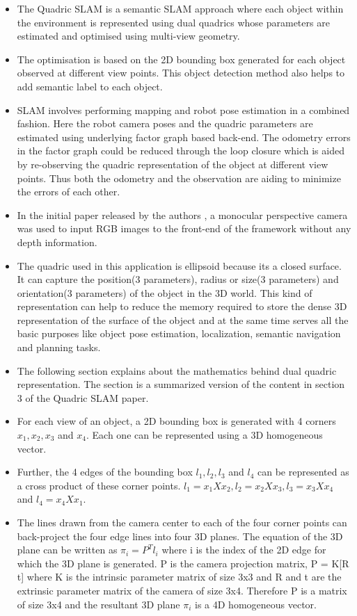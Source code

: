 \documentclass[report.tex]{subfiles}
\begin{document}
\begin{itemize}
\item The Quadric SLAM is a semantic SLAM approach where each object within the environment is represented using dual quadrics whose parameters are estimated and optimised using multi-view geometry.
\item The optimisation is based on the 2D bounding box generated for each object observed at different view points. This object detection method also helps to add semantic label to each object.
\item SLAM involves performing mapping and robot pose estimation in a combined fashion. Here the robot camera poses and the quadric parameters are estimated using underlying factor graph based back-end. The odometry errors in the factor graph could be reduced through the loop closure which is aided by re-observing the quadric representation of the object at different view points. Thus both the odometry and the observation are aiding to minimize the errors of each other.
\item In the initial paper released by the authors \cite{sünderhauf2017dual}, a monocular perspective camera was used to input RGB images to the front-end of the framework without any depth information.
\item The quadric used in this application is ellipsoid because its a closed surface. It can capture the position(3 parameters), radius or size(3 parameters) and orientation(3 parameters) of the object in the 3D world. This kind of representation can help to reduce the memory required to store the dense 3D representation of the surface of the object and at the same time serves all the basic purposes like object pose estimation, localization, semantic navigation and planning tasks.
\item The following section explains about the mathematics behind dual quadric representation. The section is a summarized version of the content in section 3 of the Quadric SLAM paper\cite{sünderhauf2017dual}.
\item For each view of an object, a 2D bounding box is generated with 4 corners $x_{1}, x_{2}, x_{3}$ and $x_{4}$. Each one can be represented using a 3D homogeneous vector.
\item Further, the 4 edges of the bounding box $l_{1}, l_{2}, l_{3}$ and $l_{4}$ can be represented as a cross product of these corner points. $l_{1} = x_{1} X x_{2}, l_{2} = x_{2} X x_{3}, l_{3} = x_{3} X x_{4}$ and $l_{4} = x_{4} X x_{1}$.
\item The lines drawn from the camera center to each of the four corner points can back-project the four edge lines into four 3D planes. The equation of the 3D plane can be written as $\pi_{i} = P^{T}l_{i}$ where i is the index of the 2D edge for which the 3D plane is generated. P is the camera projection matrix, P = K[R t] where K is the intrinsic parameter matrix of size 3x3 and R and t are the extrinsic parameter matrix of the camera of size 3x4. Therefore P is a matrix of size 3x4 and the resultant 3D plane $\pi_{i}$ is a 4D homogeneous vector.

\end{itemize}
\end{document}
